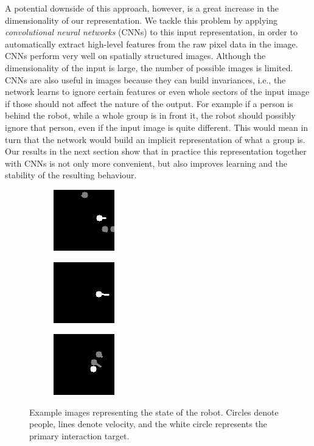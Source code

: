 \documentclass[letterpaper, 10 pt, conference]{ieeeconf}
\begin{document}
A potential downside of this approach, however, is a great increase in the dimensionality of our representation. We tackle this problem by applying \emph{convolutional neural networks} (CNNs) to this input representation, in order to automatically extract high-level features from the raw pixel data in the image. CNNs perform very well on spatially structured images.  Although the  dimensionality of the input is large, the number of possible images is limited. CNNs are also useful in images because they can build invariances, i.e., the network learns to ignore certain features or even whole sectors of the input image if those should not affect the nature of the output. For example if a person is behind the robot, while a whole group is in front it, the robot should possibly ignore that person, even if the input image is quite different. This would mean in turn that the network would build an implicit representation of what a group is. Our results in the next section show that in practice this representation together with CNNs is not only more convenient, but also improves learning and the stability of the resulting behaviour.

  	\begin{figure}[tbh]
  	\centering
      \begin{subfigure}[b]{0.30\columnwidth}
    \includegraphics[scale = 0.80]{images/state1.png}
    \label{fig:state1}
  \end{subfigure}
  \begin{subfigure}[b]{0.30\columnwidth}
    \includegraphics[scale = 0.80]{images/state2.png}
       \label{fig:state2}
  \end{subfigure} 
    \begin{subfigure}[b]{0.30\columnwidth}
    \includegraphics[scale = 0.80]{images/state3.png}
       \label{fig:state3}
  \end{subfigure}
  \caption{Example images representing the state of the robot. Circles denote people, lines denote velocity, and the white circle represents the primary interaction target.}

    \vspace{-2mm}
  \label{fig:state}
  \end{figure}
\end{document}
